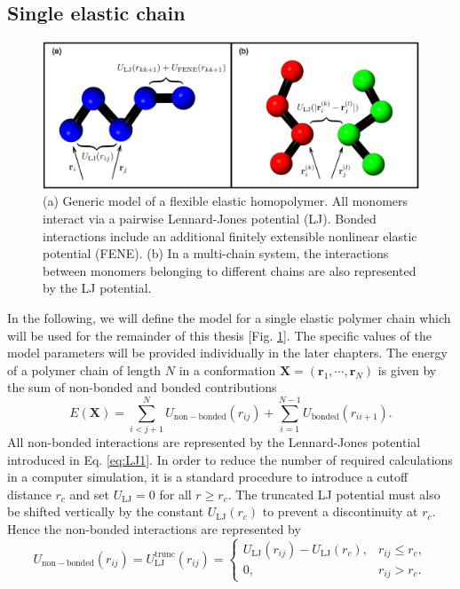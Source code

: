 \documentclass[12pt]{report}
\begin{document}
\subsection{Single elastic chain}
\label{subsec:ElasticChain}
%
\begin{figure}
\center
\includegraphics[width = 1.01\textwidth]{chapter4Figs/polymerModel.eps}
\caption{\label{fig:singleChain}%
(a) Generic model of a flexible elastic homopolymer. All monomers interact via a pairwise Lennard-Jones potential (LJ). Bonded interactions include an additional finitely extensible nonlinear elastic potential (FENE). (b) In a multi-chain system, the interactions between monomers belonging to different chains are also represented by the LJ potential.
}
\end{figure}
% 
In the following, we will define the model for a single elastic polymer chain which will be used for the remainder of this thesis [Fig.\,\,\ref{fig:singleChain}]. The specific values of the model parameters will be provided individually in the later chapters. The energy of a polymer chain of length $N$ in a conformation $\mathbf{X} = (\mathbf{r}_1,\cdots,\mathbf{r}_{N})$ is given by the sum of non-bonded and bonded contributions
\begin{equation}
E(\mathbf{X}) = \sum^{N}_{i<j+1}
U_{\mathrm{non-bonded}}(r_{ij}) + \sum^{N-1}_{i=1} 	
U_{\mathrm{bonded}}(r_{ii+1}). 
\label{totalE}
\end{equation}
%
All non-bonded interactions are represented by the Lennard-Jones potential introduced in Eq. \ref{eq:LJ1}. In order to reduce the number of required calculations in a computer simulation, it is a standard procedure to introduce a cutoff distance $r_{c}$ and set $U_{\mathrm{LJ}} = 0$ for all $r\geq r_{c}$. The truncated LJ potential must also be shifted vertically by the constant $U_{\mathrm{LJ}}(r_{c})$ to prevent a discontinuity at $r_{c}$. Hence the non-bonded interactions are represented by
%
\begin{equation}
\label{eq:LJTruncated}
U_{\mathrm{non-bonded}}(r_{ij}) = U_{\mathrm{LJ}}^{\mathrm{trunc}}(r_{ij}) =  \begin{cases}
U_{\mathrm{LJ}}(r_{ij}) -  U_{\mathrm{LJ}}(r_{c}), &
r_{ij} \leq r_{c},\\
0, &   r_{ij} > r_{c}. \end{cases}
\end{equation}
\end{document}
